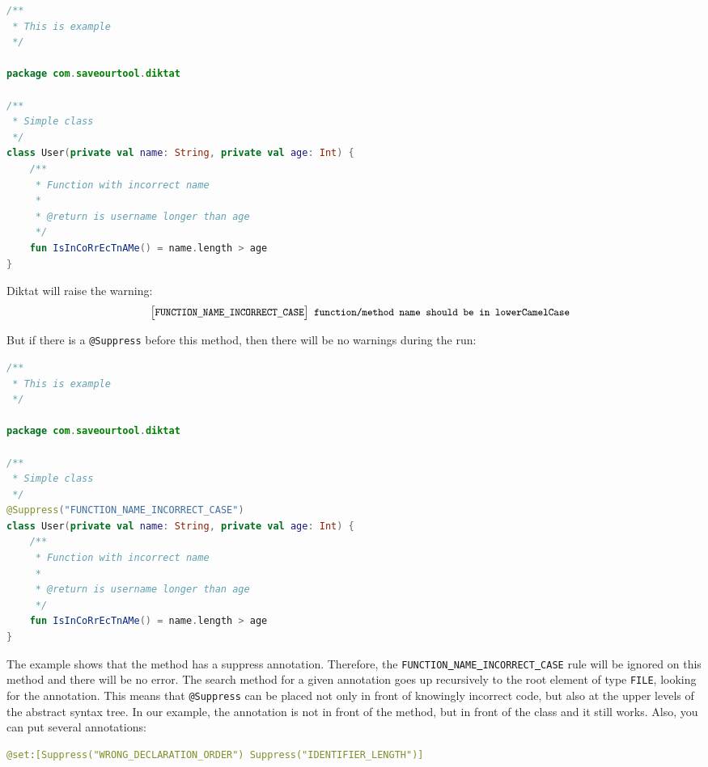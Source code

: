 \begin{lstlisting}[caption={Function with incorrect name.}, label={lst:example1}, language=Kotlin]
/**
 * This is example
 */

package com.saveourtool.diktat

/**
 * Simple class
 */
class User(private val name: String, private val age: Int) {
	/**
	 * Function with incorrect name
	 *
	 * @return is username longer than age
	 */
	fun IsInCoRrEcTnAMe() = name.length > age
}

\end{lstlisting}

Diktat will raise the warning:
$$
\texttt{ \small{ $\big[$FUNCTION\underline{ }NAME\underline{ }INCORRECT\underline{ }CASE$\big]$  function/method name should be in lowerCamelCase}}
$$

But if there is a \texttt{@Suppress} before this method, then there will be no warnings during the run:
\begin{lstlisting}[caption={Function with incorrect name, but with suppressed Inspection.}, label={lst:example1}, language=Kotlin]
/**
 * This is example
 */

package com.saveourtool.diktat

/**
 * Simple class
 */
@Suppress("FUNCTION_NAME_INCORRECT_CASE")
class User(private val name: String, private val age: Int) {
	/**
	 * Function with incorrect name
	 *
	 * @return is username longer than age
	 */
	fun IsInCoRrEcTnAMe() = name.length > age
}

\end{lstlisting}

The example shows that the method has a suppress annotation. Therefore, the \texttt{FUNCTION\underline{ }NAME\underline{ }INCORRECT\underline{ }CASE} rule will be ignored on this method and there will be no error. The search method for a given annotation goes up recursively to the root element of type \texttt{FILE}, looking for the annotation. This means that \texttt{@Suppress} can be placed not only in front of knowingly incorrect code, but also at the upper levels of the abstract syntax tree. In our example, the annotation is not in front of the method, but in front of the class and it still works. Also, you can put several annotations:
\begin{lstlisting}[caption={Several suppression annotations}, label={lst:example1}, language=Kotlin]
@set:[Suppress("WRONG_DECLARATION_ORDER") Suppress("IDENTIFIER_LENGTH")]
\end{lstlisting}

